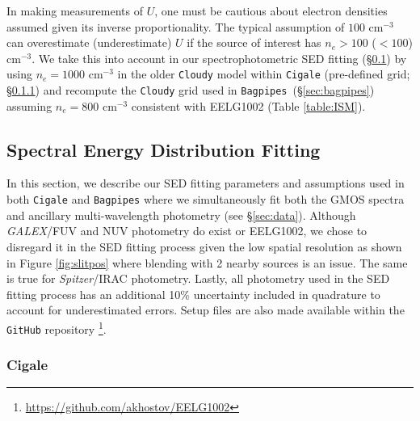 \documentclass[twocolumn,tight,times,linenumbers]{aastex631}
\newcommand{\bagpipes}{\texttt{Bagpipes}}
\begin{document}
		In making measurements of $U$, one must be cautious about electron densities assumed given its inverse proportionality. The typical assumption of $100$ cm$^{-3}$ can overestimate (underestimate) $U$ if the source of interest has $n_e > 100$ ($< 100$) cm$^{-3}$. We take this into account in our spectrophotometric SED fitting (\S\ref{sec:SED}) by using $n_e = 1000$ cm$^{-3}$ in the older \texttt{Cloudy} model within \texttt{Cigale} (pre-defined grid; \S\ref{sec:cigale}) and recompute the \texttt{Cloudy} grid used in \bagpipes~(\S\ref{sec:bagpipes}) assuming $n_e = 800$ cm$^{-3}$ consistent with EELG1002 (Table \ref{table:ISM}). 
		

		\subsection{Spectral Energy Distribution Fitting}
		\label{sec:SED}
		
		In this section, we describe our SED fitting parameters and assumptions used in both \texttt{Cigale} and \texttt{Bagpipes} where we simultaneously fit both the GMOS spectra and ancillary multi-wavelength photometry (see \S\ref{sec:data}). Although \textit{GALEX}/FUV and NUV photometry do exist or EELG1002, we chose to disregard it in the SED fitting process given the low spatial resolution as shown in Figure \ref{fig:slitpos} where blending with 2 nearby sources is an issue. The same is true for \textit{Spitzer}/IRAC photometry. Lastly, all photometry used in the SED fitting process has an additional 10\% uncertainty included in quadrature to account for underestimated errors. Setup files are also made available within the \texttt{GitHub} repository \footnote{\href{https://github.com/akhostov/EELG1002}{https://github.com/akhostov/EELG1002}}. 
		
		
		\subsubsection{{\sc Cigale}}
		\label{sec:cigale}
				
\end{document}

